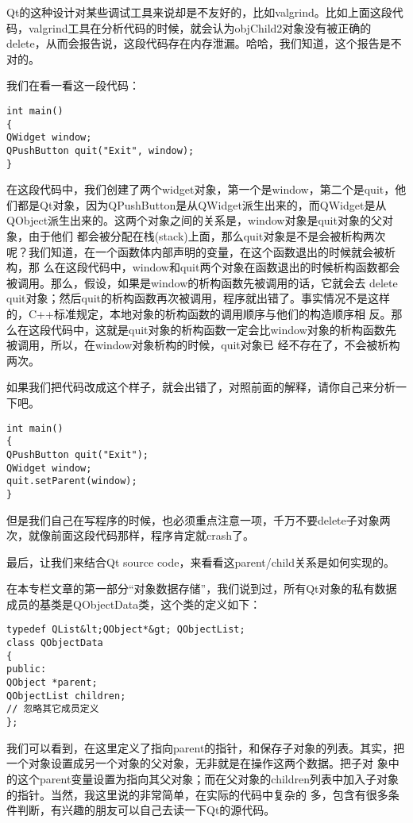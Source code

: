 Qt的这种设计对某些调试工具来说却是不友好的，比如valgrind。比如上面这段代码，valgrind工具在分析代码的时候，就会认为objChild2对象没有被正确的delete，从而会报告说，这段代码存在内存泄漏。哈哈，我们知道，这个报告是不对的。

我们在看一看这一段代码：
\begin{lstlisting}
int main()
{
QWidget window;
QPushButton quit("Exit", window);
}    
\end{lstlisting}

在这段代码中，我们创建了两个widget对象，第一个是window，第二个是quit，他们都是Qt对象，因为QPushButton是从QWidget派生出来的，而QWidget是从QObject派生出来的。这两个对象之间的关系是，window对象是quit对象的父对象，由于他们 都会被分配在栈(stack)上面，那么quit对象是不是会被析构两次呢？我们知道，在一个函数体内部声明的变量，在这个函数退出的时候就会被析构，那 么在这段代码中，window和quit两个对象在函数退出的时候析构函数都会被调用。那么，假设，如果是window的析构函数先被调用的话，它就会去 delete quit对象；然后quit的析构函数再次被调用，程序就出错了。事实情况不是这样的，C++标准规定，本地对象的析构函数的调用顺序与他们的构造顺序相 反。那么在这段代码中，这就是quit对象的析构函数一定会比window对象的析构函数先被调用，所以，在window对象析构的时候，quit对象已 经不存在了，不会被析构两次。

如果我们把代码改成这个样子，就会出错了，对照前面的解释，请你自己来分析一下吧。
\begin{lstlisting}
int main()
{
QPushButton quit("Exit");
QWidget window;
quit.setParent(window);
}    
\end{lstlisting}

但是我们自己在写程序的时候，也必须重点注意一项，千万不要delete子对象两次，就像前面这段代码那样，程序肯定就crash了。

最后，让我们来结合Qt source code，来看看这parent/child关系是如何实现的。

在本专栏文章的第一部分“对象数据存储”，我们说到过，所有Qt对象的私有数据成员的基类是QObjectData类，这个类的定义如下：
\begin{lstlisting}
typedef QList&lt;QObject*&gt; QObjectList;
class QObjectData
{
public:
QObject *parent;
QObjectList children;
// 忽略其它成员定义
};    
\end{lstlisting}

我们可以看到，在这里定义了指向parent的指针，和保存子对象的列表。其实，把一个对象设置成另一个对象的父对象，无非就是在操作这两个数据。把子对 象中的这个parent变量设置为指向其父对象；而在父对象的children列表中加入子对象的指针。当然，我这里说的非常简单，在实际的代码中复杂的 多，包含有很多条件判断，有兴趣的朋友可以自己去读一下Qt的源代码。
